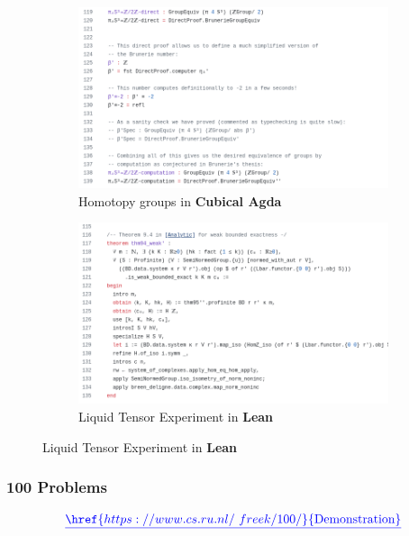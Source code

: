 \documentclass{beamer}
\theoremstyle{definition}
\theoremstyle{remark}
\begin{document}
\begin{frame}
\begin{figure}
		\vspace{0.2cm} %
		\begin{subfigure}[b]{0.45\textwidth}
						\includegraphics[width=\textwidth]{cubicalagda.png}
						\caption{\tiny Homotopy groups in \textbf{Cubical Agda}}
		\end{subfigure}
		\hspace{0.5cm}
		\begin{subfigure}[b]{0.45\textwidth}
						\includegraphics[width=\textwidth]{liquidtensor.png}
						\caption{\tiny Liquid Tensor Experiment in \textbf{Lean}}
		\end{subfigure}
	
\end{figure}
\end{frame}

\begin{frame}
	\frametitle{100 Problems}
	\[
		{\color{blue}\underline{\href{https://www.cs.ru.nl/~freek/100/}{\text{Demonstration}}}}
	\]
\end{frame}
\end{document}
